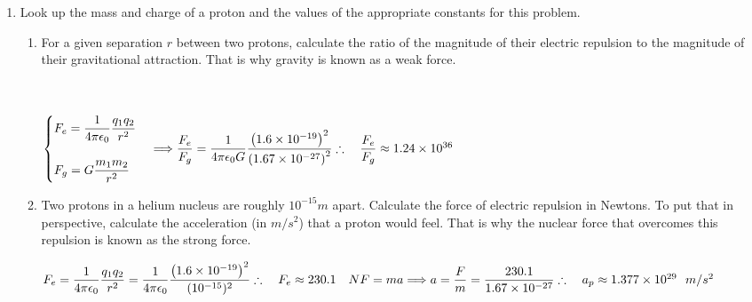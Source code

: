 \documentclass[fleqn]{article}
\begin{document}
\begin{enumerate}
    \item Look up the mass and charge of a proton and the values of the appropriate constants for this problem.
    \begin{enumerate}
      \item For a given separation $r$ between two protons, calculate the ratio
      of the magnitude of their electric repulsion to the magnitude of
      their gravitational attraction. That is why gravity is known as a
      weak force.

        \textcolor{hwColor}{
          \\
          \\
          $
            \begin{cases}
              F_e=\dfrac{1}{4 \pi \epsilon_0} \dfrac{q_1 q_2}{r^2}
              \\
              \\
              F_g=G \dfrac{m_1 m_2}{r^2}
            \end{cases} \Longrightarrow \dfrac{F_e}{F_g}=\dfrac{1}{4 \pi \epsilon_0 G}\dfrac{\left(1.6 \times 10^{-19}\right)^2}{\left(1.67 \times 10^{-27}\right)^2}
            \\
            \\
            \\
            \therefore ~~~ \dfrac{F_e}{F_g} \approx 1.24 \times 10^{36}
            \\
            \\
          $
        }

      \item Two protons in a helium nucleus are roughly $10^{-15}m$ apart. Calculate the force of 
      electric repulsion in Newtons. To put that in perspective, calculate the acceleration (in $m/s^2$) that a proton
      would feel. That is why the nuclear force that overcomes this repulsion is known as the strong force.

        \textcolor{hwColor}{
          $
            F_e=\dfrac{1}{4 \pi \epsilon_0} \dfrac{q_1 q_2}{r^2}
            =\dfrac{1}{4 \pi \epsilon_0} \dfrac{\left(1.6 \times 10^{-19}\right)^2}{(10^{-15})^2}
            \\
            \\
            \\
            \therefore ~~~ F_e \approx 230.1 ~~~ N
            \\
            \\
            \\
            F=ma \Longrightarrow a=\dfrac{F}{m}=\dfrac{230.1}{1.67 \times 10^{-27}}
            \\
            \\
            \\
            \therefore ~~~ a_p \approx 1.377 \times 10^{29} ~~ m/s^2
          $
        }

    \end{enumerate}

  \end{enumerate}
\end{document}
